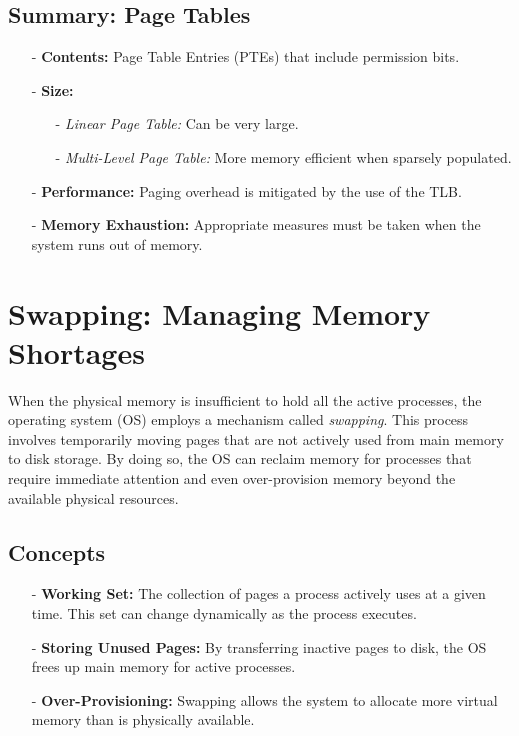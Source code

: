 \documentclass[../../compsys.tex]{subfiles}
\begin{document}
\subsection{Summary: Page Tables}
\begin{itemize}
  \item[-] \textbf{Contents:} Page Table Entries (PTEs) that include permission bits.
  \item[-] \textbf{Size:} 
    \begin{itemize}
      \item[-] \textit{Linear Page Table:} Can be very large.
      \item[-] \textit{Multi-Level Page Table:} More memory efficient when sparsely populated.
    \end{itemize}
  \item[-] \textbf{Performance:} Paging overhead is mitigated by the use of the TLB.
  \item[-] \textbf{Memory Exhaustion:} Appropriate measures must be taken when the system runs out of memory.
\end{itemize}
\section{Swapping: Managing Memory Shortages}
When the physical memory is insufficient to hold all the active processes, the operating system (OS) employs a mechanism called \emph{swapping}. This process involves temporarily moving pages that are not actively used from main memory to disk storage. By doing so, the OS can reclaim memory for processes that require immediate attention and even over-provision memory beyond the available physical resources.

\subsection{Concepts}
\begin{itemize}
  \item[-] \textbf{Working Set:} The collection of pages a process actively uses at a given time. This set can change dynamically as the process executes.
  \item[-] \textbf{Storing Unused Pages:} By transferring inactive pages to disk, the OS frees up main memory for active processes.
  \item[-] \textbf{Over-Provisioning:} Swapping allows the system to allocate more virtual memory than is physically available.
\end{itemize}
\newpage
\end{document}
